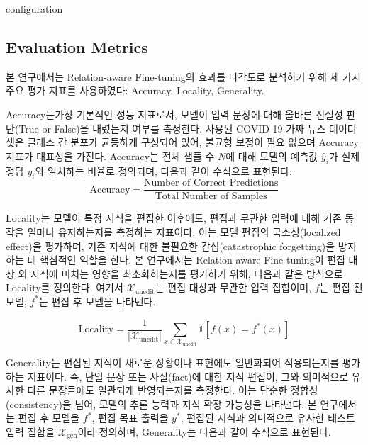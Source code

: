 \documentclass[a4paper,fleqn]{cas-sc}
\begin{document}
configuration

\subsection{Evaluation Metrics}

본 연구에서는 Relation-aware Fine-tuning의 효과를 다각도로 분석하기 위해 세 가지 주요 평가 지표를 사용하였다: Accuracy, Locality, Generality.


Accuracy는가장 기본적인 성능 지표로서, 모델이 입력 문장에 대해 올바른 진실성 판단(True or False)을 내렸는지 여부를 측정한다.  
사용된 COVID-19 가짜 뉴스 데이터셋은 클래스 간 분포가 균등하게 구성되어 있어, 불균형 보정이 필요 없으며 Accuracy 지표가 대표성을 가진다.  
Accuracy는 전체 샘플 수 \( N \)에 대해 모델의 예측값 \( \hat{y}_i \)가 실제 정답 \( y_i \)와 일치하는 비율로 정의되며, 다음과 같이 수식으로 표현된다:
\begin{equation}
    \text{Accuracy} = \frac{\text{Number of Correct Predictions}}{\text{Total Number of Samples}}
\end{equation}

Locality는 모델이 특정 지식을 편집한 이후에도, 편집과 무관한 입력에 대해 기존 동작을 얼마나 유지하는지를 측정하는 지표이다.
이는 모델 편집의 국소성(localized effect)을 평가하며, 기존 지식에 대한 불필요한 간섭(catastrophic forgetting)을 방지하는 데 핵심적인 역할을 한다.
본 연구에서는 Relation-aware Fine-tuning이 편집 대상 외 지식에 미치는 영향을 최소화하는지를 평가하기 위해, 다음과 같은 방식으로 Locality를 정의한다.
여기서 \( \mathcal{X}_{\text{unedit}} \)는 편집 대상과 무관한 입력 집합이며, \( f \)는 편집 전 모델, \( f^* \)는 편집 후 모델을 나타낸다.

\begin{equation}
\text{Locality} = \frac{1}{\left| \mathcal{X}_{\text{unedit}} \right|} \sum_{x \in \mathcal{X}_{\text{unedit}}} \mathbb{1} \left[ f(x) = f^*(x) \right]
\end{equation}



 
Generality는 편집된 지식이 새로운 상황이나 표현에도 일반화되어 적용되는지를 평가하는 지표이다.  
즉, 단일 문장 또는 사실(fact)에 대한 지식 편집이, 그와 의미적으로 유사한 다른 문장들에도 일관되게 반영되는지를 측정한다.  
이는 단순한 정합성(consistency)을 넘어, 모델의 추론 능력과 지식 확장 가능성을 나타낸다.
본 연구에서는 편집 후 모델을 \( f^* \), 편집 목표 출력을 \( y^* \), 편집된 지식과 의미적으로 유사한 테스트 입력 집합을 \( \mathcal{X}_{\text{gen}} \)이라 정의하며, Generality는 다음과 같이 수식으로 표현된다.
\end{document}

